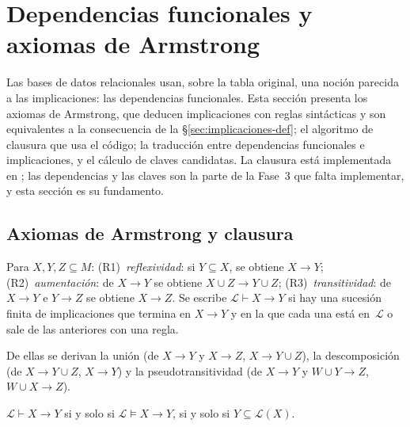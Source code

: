 \section{Dependencias funcionales y axiomas de Armstrong}
\label{sec:armstrong}

Las bases de datos relacionales usan, sobre la tabla original, una noción parecida a las implicaciones: las dependencias funcionales. Esta sección presenta los axiomas de Armstrong, que deducen implicaciones con reglas sintácticas y son equivalentes a la consecuencia de la \S\ref{sec:implicaciones-def}; el algoritmo de clausura que usa el código; la traducción entre dependencias funcionales e implicaciones, y el cálculo de claves candidatas. La clausura está implementada en ; las dependencias y las claves son la parte de la Fase~3 que falta implementar, y esta sección es su fundamento.


\subsection{Axiomas de Armstrong y clausura}
\label{sec:axiomas}

\begin{definicion}\label{def:armstrong}
Para $X, Y, Z \subseteq M$: (R1)~\emph{reflexividad}: si $Y \subseteq X$, se obtiene $X \to Y$; (R2)~\emph{aumentación}: de $X \to Y$ se obtiene $X \cup Z \to Y \cup Z$; (R3)~\emph{transitividad}: de $X \to Y$ e $Y \to Z$ se obtiene $X \to Z$. Se escribe $\mathcal{L} \vdash X \to Y$ si hay una sucesión finita de implicaciones que termina en $X \to Y$ y en la que cada una está en~$\mathcal{L}$ o sale de las anteriores con una regla.
\end{definicion}

De ellas se derivan la unión (de $X \to Y$ y $X \to Z$, $X \to Y \cup Z$), la descomposición (de $X \to Y \cup Z$, $X \to Y$) y la pseudotransitividad (de $X \to Y$ y $W \cup Y \to Z$, $W \cup X \to Z$).

\begin{teorema}\label{teo:armstrong}
$\mathcal{L} \vdash X \to Y$ si y solo si $\mathcal{L} \models X \to Y$, si y solo si $Y \subseteq \mathcal{L}(X)$.
\end{teorema}

